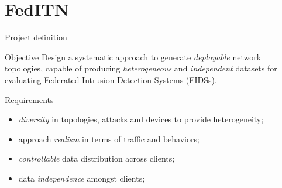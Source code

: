 \section{FedITN}

\begin{frame}{Project definition}
  \begin{block}{Objective}
    Design a systematic approach to generate \emph<+>{deployable} network topologies, capable of producing \emph<+>{heterogeneous} and \emph<+>{independent} datasets for evaluating Federated Intrusion Detection Systems (FIDSs).
  \end{block}

  \pause
  \begin{block}{Requirements}
    \begin{itemize}[<+->]
      \item \emph{diversity} in topologies, attacks and devices to provide heterogeneity;
      \item approach \emph{realism} in terms of traffic and behaviors;
      \item \emph{controllable} data distribution across clients;
      \item data \emph{independence} amongst clients;
    \end{itemize}
  \end{block}
\end{frame}


